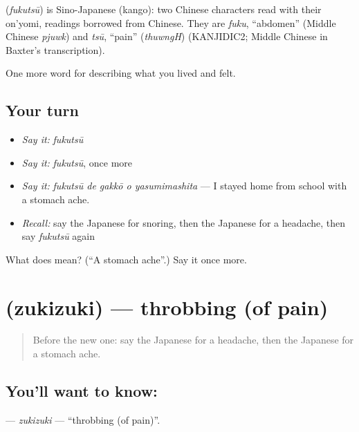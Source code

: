 \begin{cousinweb}
\textbf{} (\emph{fukutsū}) is Sino-Japanese (kango): two Chinese characters read with their on'yomi, readings borrowed from Chinese. They are \emph{fuku}, \textquotedblleft{}abdomen\textquotedblright{} (Middle Chinese \emph{pjuwk}) and \emph{tsū}, \textquotedblleft{}pain\textquotedblright{} (\emph{thuwngH}) (KANJIDIC2; Middle Chinese in Baxter's transcription).
\end{cousinweb}

\begin{grammarlens}[title={What you've built}]
One more word for describing what you lived and felt.
\end{grammarlens}

\subsection*{Your turn}
\begin{itemize}
\raggedright
  \item \emph{Say it:} \emph{fukutsū}
  \item \emph{Say it:} \emph{fukutsū}, once more
  \item \emph{Say it:} \emph{fukutsū de gakkō o yasumimashita} — I stayed home from school with a stomach ache.
  \item \emph{Recall:} say the Japanese for snoring, then the Japanese for a headache, then say \emph{fukutsū} again
\end{itemize}

\begin{tcolorbox}[breakable,colback=teal!4,colframe=teal!35!black,title={Before you move on}]
What does  mean? (\textquotedblleft{}A stomach ache\textquotedblright{}.) Say it once more.
\end{tcolorbox}
\section[\texorpdfstring{\ja{ずきずき} (zukizuki)}{ずきずき (zukizuki)}]{ (zukizuki) — throbbing (of pain)}

\label{lesson:JA-C445-zukizuki}



\begin{quote}
Before the new one: say the Japanese for a headache, then the Japanese for a stomach ache.
\end{quote}

\subsection*{You'll want to know: }
\textbf{} — \emph{zukizuki} — \textquotedblleft{}throbbing (of pain)\textquotedblright{}.

